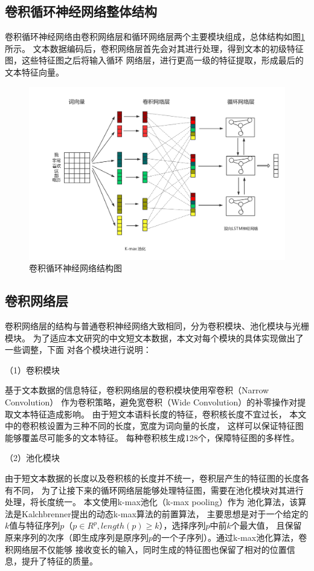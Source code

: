 \subsection{卷积循环神经网络整体结构}
卷积循环神经网络由卷积网络层和循环网络层两个主要模块组成，总体结构如图\ref{CLSTM}所示。
文本数据编码后，卷积网络层首先会对其进行处理，得到文本的初级特征图，这些特征图之后将输入循环
网络层，进行更高一级的特征提取，形成最后的文本特征向量。
\begin{figure}[h]
    \includegraphics[scale=0.35]{picture/CLSTM.png}
    \caption{卷积循环神经网络结构图}
    \label{CLSTM}
\end{figure}
\subsection{卷积网络层}
卷积网络层的结构与普通卷积神经网络大致相同，分为卷积模块、池化模块与光栅模块。
为了适应本文研究的中文短文本数据，本文对每个模块的具体实现做出了一些调整，下面
对各个模块进行说明：

（1）卷积模块

基于文本数据的信息特征，卷积网络层的卷积模块使用窄卷积（Narrow Convolution）
作为卷积策略，避免宽卷积（Wide Convolution）的补零操作对提取文本特征造成影响。
由于短文本语料长度的特征，卷积核长度不宜过长，
本文中的卷积核设置为三种不同的长度，宽度为词向量的长度，
这样可以保证特征图能够覆盖尽可能多的文本特征。
每种卷积核生成128个，保障特征图的多样性。

（2）池化模块

由于短文本数据的长度以及卷积核的长度并不统一，卷积层产生的特征图的长度各有不同，
为了让接下来的循环网络层能够处理特征图，需要在池化模块对其进行处理，将长度统一。
本文使用k-max池化（k-max pooling）作为
池化算法，该算法是Kalchbrenner提出的动态k-max算法的前置算法，
主要思想是对于一个给定的$k$值与特征序列$p$（$p\in R^p,length(p)\geq k$），选择序列$p$中前$k$个最大值，
且保留原来序列的次序（即生成序列是原序列$p$的一个子序列）。通过k-max池化算法，卷积网络层不仅能够
接收变长的输入，同时生成的特征图也保留了相对的位置信息，提升了特征的质量。

